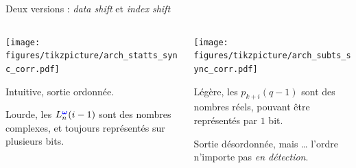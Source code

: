 \documentclass[../main.tex]{subfiles}
\begin{document}
\begin{frame}{Deux versions : \textit{data shift} et \textit{index shift}}{}
  \centering

  \vspace{-1 em}
  \begin{columns}
    \begin{column}{.5\linewidth}
      \begin{overlayarea}{\linewidth}{.9\textheight}
        \centering
        \texttt{[image: figures/tikzpicture/arch\_statts\_sync\_corr.pdf]}

        \begin{ctrlitemize}{0pt}
          \item [\bonus] Intuitive, sortie ordonnée.
          \item [\malus] Lourde, les $L^{\textcolor{blue}{\bm{\omega}}}_{n}(i - 1)$ sont des nombres complexes, et toujours représentés sur plusieurs bits.
        \end{ctrlitemize}
      \end{overlayarea}
    \end{column}
    \begin{column}{.5\linewidth}
      \begin{overlayarea}{\linewidth}{.9\textheight}
        \centering
        \texttt{[image: figures/tikzpicture/arch\_subts\_sync\_corr.pdf]}

        \begin{ctrlitemize}{0pt}
          \item [\bonus] Légère, les $p_{k + i}(q -1)$ sont des nombres réels, pouvant être représentés par $1$ bit.
          \item [\textcolor{RoyalBlue}{\malus}] Sortie désordonnée, mais \dots{} l'ordre n'importe pas \textit{en détection}.
        \end{ctrlitemize}
      \end{overlayarea}
    \end{column}
  \end{columns}
\end{frame}
\end{document}
